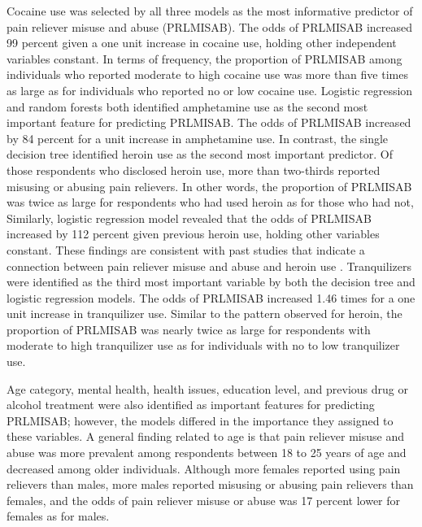 \documentclass[sigconf]{acmart}
\begin{document}
Cocaine use was selected by all three models as the most informative predictor 
of pain reliever misuse and abuse (PRLMISAB). The odds of PRLMISAB increased 
99 percent given a one unit increase in cocaine use, holding other independent
variables constant. In terms of frequency, the proportion of PRLMISAB among 
individuals who reported moderate to high cocaine use was more than five times 
as large as for individuals who reported no or low cocaine use. Logistic 
regression and random forests both identified amphetamine use as the second 
most important feature for predicting PRLMISAB. The odds of PRLMISAB
increased by 84 percent for a unit increase in amphetamine use. In contrast, 
the single decision tree identified heroin use as the second most important 
predictor. Of those respondents who disclosed heroin use, more than two-thirds 
reported misusing or abusing pain relievers. In other words, the proportion of 
PRLMISAB was twice as large for respondents who had used heroin as for those 
who had not, Similarly, logistic regression model revealed that the odds of 
PRLMISAB increased by 112 percent given previous heroin use, holding other 
variables constant. These findings are consistent with past studies that
indicate a connection between pain reliever misuse and abuse and heroin use
\cite{jones13, jones15, muhuri13, unick13}. Tranquilizers were identified as 
the third most important variable by both the decision tree and logistic 
regression models. The odds of PRLMISAB increased 1.46 times for a one unit 
increase in tranquilizer use. Similar to the pattern observed for heroin, the 
proportion of PRLMISAB was nearly twice as large for respondents with moderate 
to high tranquilizer use as for individuals with no to low tranquilizer use. 

Age category, mental health, health issues, education level, and previous 
drug or alcohol treatment were also identified as important features for 
predicting PRLMISAB; however, the models differed in the importance they 
assigned to these variables. A general finding related to age is that pain 
reliever misuse and abuse was more prevalent among respondents between
18 to 25 years of age and decreased among older individuals. Although more 
females reported using pain relievers than males, more males reported 
misusing or abusing pain relievers than females, and the odds of pain reliever 
misuse or abuse was 17 percent lower for females as for males. 

\end{document}
